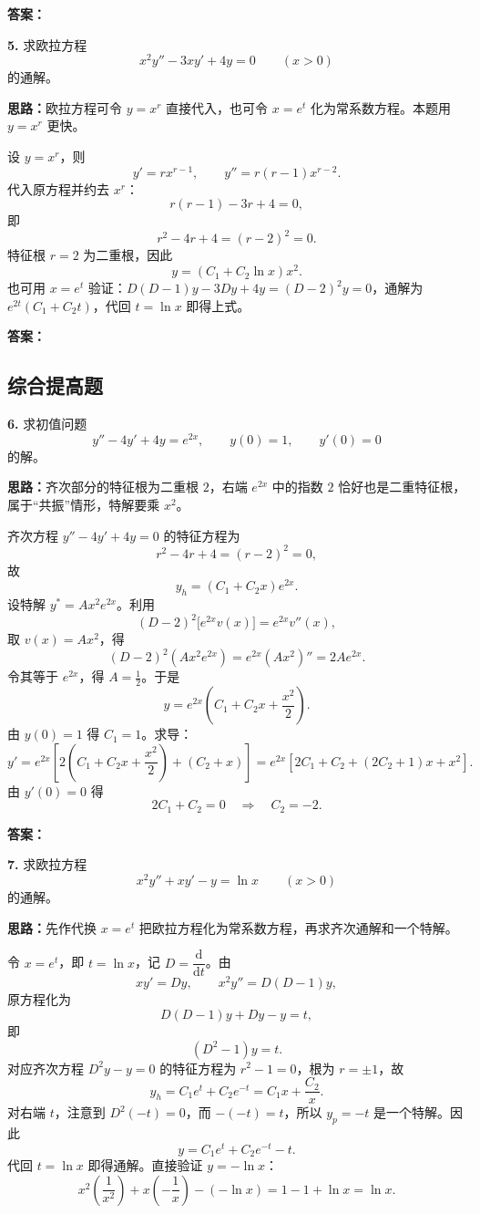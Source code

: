 \textbf{答案：}

\else \answerarea[8] \fi%
\textbf{5.} 求欧拉方程
\[
x^2y''-3xy'+4y=0\qquad (x>0)
\]
的通解。

\ifshowsolutions%
\textbf{思路：}欧拉方程可令 $y=x^r$ 直接代入，也可令 $x=e^t$ 化为常系数方程。本题用 $y=x^r$ 更快。

设 $y=x^r$，则
\[
y'=rx^{r-1},\qquad y''=r(r-1)x^{r-2}.
\]
代入原方程并约去 $x^r$：
\[
r(r-1)-3r+4=0,
\]
即
\[
r^2-4r+4=(r-2)^2=0.
\]
特征根 $r=2$ 为二重根，因此
\[
y=(C_1+C_2\ln x)x^2.
\]
也可用 $x=e^t$ 验证：$D(D-1)y-3Dy+4y=(D-2)^2y=0$，通解为 $e^{2t}(C_1+C_2t)$，代回 $t=\ln x$ 即得上式。

\textbf{答案：}

\else \answerarea[8] \fi%
\subsection{综合提高题}

\textbf{6.} 求初值问题
\[
y''-4y'+4y=e^{2x},\qquad y(0)=1,\qquad y'(0)=0
\]
的解。

\ifshowsolutions%
\textbf{思路：}齐次部分的特征根为二重根 $2$，右端 $e^{2x}$ 中的指数 $2$ 恰好也是二重特征根，属于“共振”情形，特解要乘 $x^2$。

齐次方程 $y''-4y'+4y=0$ 的特征方程为
\[
r^2-4r+4=(r-2)^2=0,
\]
故
\[
y_h=(C_1+C_2x)e^{2x}.
\]
设特解 $y^*=Ax^2e^{2x}$。利用
\[
(D-2)^2\bigl[e^{2x}v(x)\bigr]=e^{2x}v''(x),
\]
取 $v(x)=Ax^2$，得
\[
(D-2)^2(Ax^2e^{2x})=e^{2x}(Ax^2)''=2Ae^{2x}.
\]
令其等于 $e^{2x}$，得 $A=\frac12$。于是
\[
y=e^{2x}\left(C_1+C_2x+\frac{x^2}{2}\right).
\]
由 $y(0)=1$ 得 $C_1=1$。求导：
\[
y'=e^{2x}\left[2\left(C_1+C_2x+\frac{x^2}{2}\right)+\left(C_2+x\right)\right]
=e^{2x}\left[2C_1+C_2+(2C_2+1)x+x^2\right].
\]
由 $y'(0)=0$ 得
\[
2C_1+C_2=0
\quad\Longrightarrow\quad
C_2=-2.
\]

\textbf{答案：}

\else \answerarea[10] \fi%
\textbf{7.} 求欧拉方程
\[
x^2y''+xy'-y=\ln x\qquad (x>0)
\]
的通解。

\ifshowsolutions%
\textbf{思路：}先作代换 $x=e^t$ 把欧拉方程化为常系数方程，再求齐次通解和一个特解。

令 $x=e^t$，即 $t=\ln x$，记 $D=\dfrac{\mathrm{d}}{\mathrm{d}t}$。由
\[
xy'=Dy,\qquad x^2y''=D(D-1)y,
\]
原方程化为
\[
D(D-1)y+Dy-y=t,
\]
即
\[
(D^2-1)y=t.
\]
对应齐次方程 $D^2y-y=0$ 的特征方程为 $r^2-1=0$，根为 $r=\pm1$，故
\[
y_h=C_1e^t+C_2e^{-t}=C_1x+\frac{C_2}{x}.
\]
对右端 $t$，注意到 $D^2(-t)=0$，而 $-( -t)=t$，所以 $y_p=-t$ 是一个特解。因此
\[
y=C_1e^t+C_2e^{-t}-t.
\]
代回 $t=\ln x$ 即得通解。直接验证 $y=-\ln x$：
\[
x^2\left(\frac{1}{x^2}\right)+x\left(-\frac1x\right)-(-\ln x)
=1-1+\ln x=\ln x.
\]

